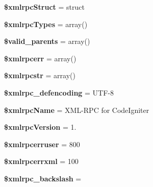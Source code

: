 \begin{DoxyCompactItemize}
{\bfseries \$xmlrpc\+Struct} = \textquotesingle{}struct\textquotesingle{}
\item 
\mbox{\label{class_c_i___xmlrpc_a2b937e1ca5ee8495f0251a74222cec64}} 
{\bfseries \$xmlrpc\+Types} = array()
\item 
\mbox{\label{class_c_i___xmlrpc_a801945a338a9dee5f723c00cb71657b7}} 
{\bfseries \$valid\+\_\+parents} = array()
\item 
\mbox{\label{class_c_i___xmlrpc_a915a90a791db11a94f665567d2f5ad01}} 
{\bfseries \$xmlrpcerr} = array()
\item 
\mbox{\label{class_c_i___xmlrpc_a89bbdd6a565dd3af2378b44fc5f156a0}} 
{\bfseries \$xmlrpcstr} = array()
\item 
\mbox{\label{class_c_i___xmlrpc_a7a31af447cebbb81b1f3c5581cd90d5a}} 
{\bfseries \$xmlrpc\+\_\+defencoding} = \textquotesingle{}U\+TF-\/8\textquotesingle{}
\item 
\mbox{\label{class_c_i___xmlrpc_a1311a8891b845bf89b1bc459d54a6312}} 
{\bfseries \$xmlrpc\+Name} = \textquotesingle{}X\+ML-\/R\+PC for Code\+Igniter\textquotesingle{}
\item 
\mbox{\label{class_c_i___xmlrpc_a4130f55bb1f23dcabf9cf3ae5f5a746d}} 
{\bfseries \$xmlrpc\+Version} = \textquotesingle{}1.\textquotesingle{}
\item 
\mbox{\label{class_c_i___xmlrpc_a45bf41f1e861f94e04f463a638e5abf5}} 
{\bfseries \$xmlrpcerruser} = 800
\item 
\mbox{\label{class_c_i___xmlrpc_af2500be600bfad88988409e6ff64c01c}} 
{\bfseries \$xmlrpcerrxml} = 100
\item 
\mbox{\label{class_c_i___xmlrpc_a2bfcef776e3e3cd8f7700e375c6ccaec}} 
{\bfseries \$xmlrpc\+\_\+backslash} = \textquotesingle{}\textquotesingle{}
\item 
\mbox{\label{class_c_i___xmlrpc_ad1405dc1ba2e288764378e79bff7a87d}} 

\end{DoxyCompactItemize}
